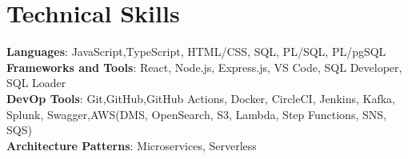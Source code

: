 \documentclass[letterpaper,11pt]{article}
\begin{document}
	\section{Technical Skills}
	\begin{itemize}[leftmargin=0.15in, label={}]
		\small{\item{
				\textbf{Languages}{: JavaScript,TypeScript, HTML/CSS, SQL, PL/SQL, PL/pgSQL} \\
				\textbf{Frameworks and Tools}{: React,  Node.js, Express.js, VS Code, SQL Developer, SQL Loader} \\
				\textbf{DevOp Tools}{: Git,GitHub,GitHub Actions, Docker, CircleCI, Jenkins, Kafka, Splunk, Swagger,AWS(DMS, OpenSearch, S3, Lambda, Step Functions, SNS, SQS)} \\
				\textbf{Architecture Patterns}{: Microservices, Serverless}\\
				
		}}
	\end{itemize}
	
	
\end{document}
